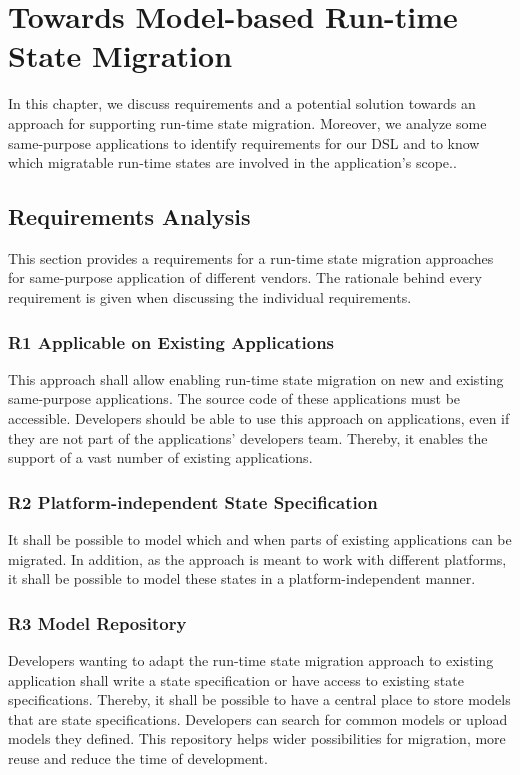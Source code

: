 \chapter{Towards Model-based Run-time State Migration}
In this chapter, we discuss requirements and a potential solution towards an approach for supporting run-time state migration. Moreover, we analyze some same-purpose applications to identify requirements for our DSL and to know which migratable run-time states are involved in the application's scope..

\label{ch:requirements}

\section{Requirements Analysis}
This section provides a requirements for a run-time state migration approaches for same-purpose application of different vendors. The rationale behind every requirement is given when discussing the individual requirements. 

\subsection{R1 Applicable on Existing Applications}
This approach shall allow enabling run-time state migration on new and existing same-purpose applications. The source code of these applications must be accessible. Developers should be able to use this approach on applications, even if they are not part of the applications' developers team. Thereby, it enables the support of a vast number of existing applications.


\subsection{R2 Platform-independent State Specification}
It shall be possible to model which and when parts of existing applications can be migrated. In addition, as the approach is meant to work with different platforms, it shall be possible to model these states in a platform-independent manner.

\subsection{R3 Model Repository}
Developers wanting to adapt the run-time state migration approach to existing application shall write a state specification or have access to existing state specifications. Thereby, it shall be possible to have a central place to store models that are state specifications. Developers can search for common models or upload models they defined. This repository helps wider possibilities for migration, more reuse and reduce the time of development. 

